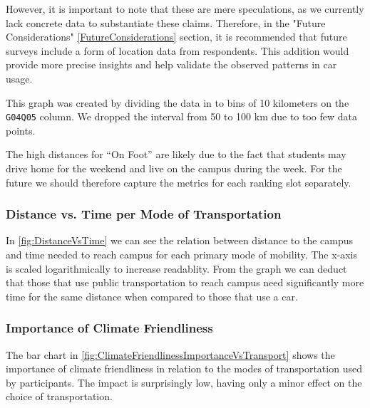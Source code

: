 However, it is important to note that these are mere speculations, as we currently lack concrete data to substantiate these claims. Therefore, in the "Future Considerations" \ref{FutureConsiderations} section, it is recommended that future surveys include a form of location data from respondents. This addition would provide more precise insights and help validate the observed patterns in car usage.

This graph was created by dividing the data in to bins of 10 kilometers on the \texttt{G04Q05} column. We dropped the interval from 50 to 100 km due to too few data points.

The high distances for ``On Foot'' are likely due to the fact that students may drive home for the weekend and live on the campus during the week. For the future we should therefore capture the metrics for each ranking slot separately.

\subsubsection{Distance vs. Time per Mode of Transportation}
\begin{multicols}{2}
    
    \columnbreak
    In \ref{fig:DistanceVsTime} we can see the relation between distance to the campus and time needed to reach campus for each primary mode of mobility. The x-axis is scaled logarithmically to increase readablity. From the graph we can deduct that those that use public transportation to reach campus need significantly more time for the same distance when compared to those that use a car.
\end{multicols}

\subsubsection{Importance of Climate Friendliness}
\begin{multicols}{2}
    
    \columnbreak 
    The bar chart in \ref{fig:ClimateFriendlinessImportanceVsTransport} shows the importance of climate friendliness in relation to the modes of transportation used by participants.
    The impact is surprisingly low, having only a minor effect on the choice of transportation.
\end{multicols}

\pagebreak

